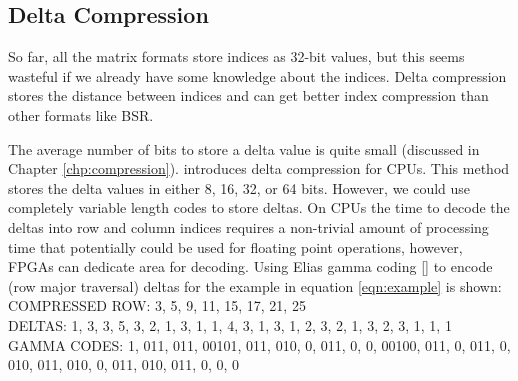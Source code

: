 \subsection{Delta Compression}
\label{sec:delta}
So far, all the matrix formats store indices as 32-bit values, but this seems wasteful if we already have some knowledge about the indices. Delta compression stores the distance between indices and can get better index compression than other formats like BSR.
\par The average number of bits to store a delta value is quite small (discussed in Chapter \ref{chp:compression}). \cite{prelim:kourtis} introduces delta compression for CPUs. This method stores the delta values in either 8, 16, 32, or 64 bits. However, we could use completely variable length codes to store deltas. On CPUs the time to decode the deltas into row and column indices requires a non-trivial amount of processing time that potentially could be used for floating point operations, however, FPGAs can dedicate area for decoding. Using Elias gamma coding [\cite{prelim:elias}] to encode (row major traversal) deltas for the example in equation \ref{eqn:example} is shown:\\
   COMPRESSED ROW: 3, 5, 9, 11, 15, 17, 21, 25 \\
DELTAS: 1, 3, 3, 5, 3, 2, 1, 3, 1, 1, 4, 3, 1, 3, 1, 2, 3, 2, 1, 3, 2, 3, 1, 1, 1\\
GAMMA CODES: 1, 011, 011, 00101, 011, 010, 0, 011, 0, 0, 00100, 011, 0, 011, 0, 010, 011, 010, 0, 011, 010, 011, 0, 0, 0 \par
